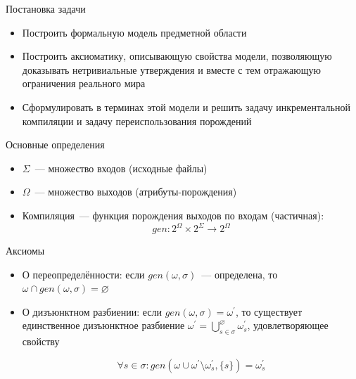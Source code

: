 \begin{frame}{Постановка задачи}
\begin{itemize}
	\item Построить формальную модель предметной области
	\item Построить аксиоматику, описывающую свойства модели, позволяющую доказывать нетривиальные утверждения и вместе с тем отражающую ограничения реального мира
	\item Сформулировать в терминах этой модели и решить задачу инкрементальной компиляции и задачу переиспользования порождений
\end{itemize}
\end{frame}

\begin{frame}{Основные определения}

\begin{itemize}
	\item $\Sigma$~--- множество входов (исходные файлы)
	\item $\Omega$~--- множество выходов (атрибуты-порождения)
	\item Компиляция~--- функция порождения выходов по входам (частичная): $$gen : 2^\Omega \times 2^\Sigma \to 2^\Omega$$
\end{itemize}
\end{frame}

\begin{frame}{Аксиомы}
\begin{itemize}
	\item О переопределённости: если $gen(\omega,\sigma)$~--- определена, то $\omega\cap gen(\omega,\sigma) = \varnothing$
	
	\item О дизъюнктном разбиении: если $gen(\omega,\sigma) = \omega^\prime$, то существует единственное дизъюнктное разбиение $\omega^\prime=\bigcup^\varnothing_{s\in\sigma}\omega^\prime_s$, 
	удовлетворяющее свойству 

	$$\forall s\in\sigma : gen(\omega\cup\omega^\prime\setminus\omega^\prime_s,\{s\})=\omega^\prime_s$$
\end{itemize}
\end{frame}

